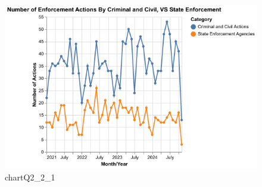 \documentclass[
  letterpaper,
  DIV=11,
  numbers=noendperiod]{scrartcl}
\begin{document}
\begin{figure}[H]

{\centering \includegraphics{chartQ2_2_1.png}

}

\caption{chartQ2\_2\_1}

\end{figure}%
\end{document}
